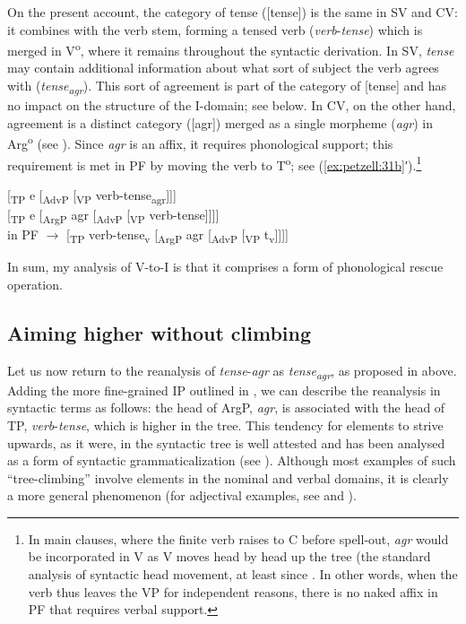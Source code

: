\documentclass[output=paper,colorlinks,citecolor=brown,draft,draftmode]{langscibook}
\begin{document}
On the present account, the category of tense ([tense]) is the same in SV and CV: it combines with the verb stem, forming a tensed verb (\textit{verb}-\textit{tense}) which is merged in V\textsuperscript{o}, where it remains throughout the syntactic derivation. In SV, \textit{tense} may contain additional information about what sort of subject the verb agrees with (\textit{tense\textsubscript{agr}}). This sort of agreement is part of the category of [tense] and has no impact on the structure of the I-domain; see  below. In CV, on the other hand, agreement is a distinct category ([agr]) merged as a single morpheme (\textit{agr}) in Arg\textsuperscript{o} (see ). Since \textit{agr} is an affix, it requires phonological support; this requirement is met in PF by moving the verb to T\textsuperscript{o}; see (\ref{ex:petzell:31b}′).\footnote{In
    main clauses, where the finite verb raises to C before spell-out, \textit{agr} would be incorporated in V as V moves head by head up the tree (the standard analysis of syntactic head movement, at least since \citet{Chomsky2001}. In other words, when the verb thus leaves the VP for independent reasons, there is no naked affix in PF that requires verbal support.
}


\ea\label{ex:petzell:31}
\ea\label{ex:petzell:31a}  [\textsubscript{TP} e [\textsubscript{AdvP} [\textsubscript{VP} {verb-tense\textsubscript{agr}}]]]\\
\ex\label{ex:petzell:31b}   [\textsubscript{TP} e [\textsubscript{ArgP} {agr} [\textsubscript{AdvP} [\textsubscript{VP} {verb-tense}]]]]  \\
  in PF $\to$ [\textsubscript{TP} {verb-tense}\textsubscript{v} [\textsubscript{ArgP} {agr} [\textsubscript{AdvP} [\textsubscript{VP} t\textsubscript{v}]]]]
\z
\z


In sum, my analysis of V-to-I is that it comprises a form of phonological rescue operation.


\subsection{Aiming higher without climbing}\label{sec:petzell:5.2}


Let us now return to the reanalysis of \textit{tense}-\textit{agr} as \textit{tense\textsubscript{agr}}, as proposed in  above. Adding the more fine-grained IP outlined in , we can describe the reanalysis in syntactic terms as follows: the head of ArgP, \textit{agr}, is associated with the head of TP, \textit{verb}-\textit{tense}, which is higher in the tree. This tendency for elements to strive upwards, as it were, in the syntactic tree is well attested and has been analysed as a form of syntactic grammaticalization (see \citealt{RobertsRoussou1999,RobertsRoussou2003}). Although most examples of such “tree-climbing” involve elements in the nominal and verbal domains, it is clearly a more general phenomenon (for adjectival examples, see \citealt{Oxford2017} and ).
\end{document}
